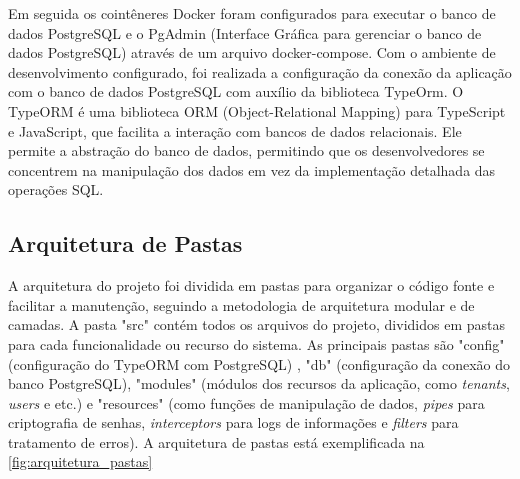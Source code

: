 Em seguida os cointêneres Docker foram configurados para executar o banco de dados PostgreSQL e o PgAdmin (Interface Gráfica para gerenciar o banco de dados PostgreSQL) através de um arquivo docker-compose. Com o ambiente de desenvolvimento configurado, foi realizada a configuração da conexão da aplicação com o banco de dados PostgreSQL com auxílio da biblioteca TypeOrm. O TypeORM é uma biblioteca ORM (Object-Relational Mapping) para TypeScript e JavaScript, que facilita a interação com bancos de dados relacionais. Ele permite a abstração do banco de dados, permitindo que os desenvolvedores se concentrem na manipulação dos dados em vez da implementação detalhada das operações SQL.

\subsection{Arquitetura de Pastas}\label{subsec:arquitetura_pastas}

A arquitetura do projeto foi dividida em pastas para organizar o código fonte e facilitar a manutenção, seguindo a metodologia de arquitetura modular e de camadas. A pasta "src" contém todos os arquivos do projeto, divididos em pastas para cada funcionalidade ou recurso do sistema. As principais pastas são "config" (configuração do TypeORM com PostgreSQL) , "db" (configuração da conexão do banco PostgreSQL), "modules" (módulos dos recursos da aplicação, como \textit{tenants}, \textit{users} e etc.) e "resources" (como funções de manipulação de dados, \textit{pipes} para criptografia de senhas, \textit{interceptors} para logs de informações e \textit{filters} para tratamento de erros). A arquitetura de pastas está exemplificada na \autoref{fig:arquitetura_pastas}


